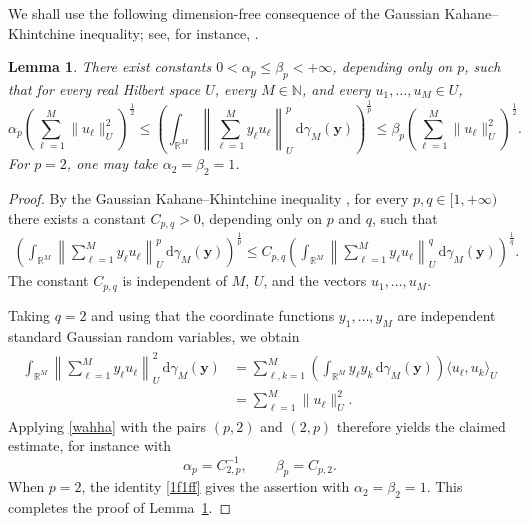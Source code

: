\documentclass[12pt]{article}
\theoremstyle{plain}
\newtheorem{lemma}[theorem]{Lemma}
\theoremstyle{definition}
\theoremstyle{remark}
\numberwithin{equation}{section}
\begin{document}
We shall use the following dimension-free consequence of the Gaussian
Kahane--Khintchine inequality; see, for instance,
\cite[Theorem~6.2.6, p.~23]{HNVW}.

\begin{lemma}
	\label{lem:gaussian-randomization-hilbert}
There exist constants
	$0<\alpha_p\leqslant\beta_p<+\infty$, depending only on $p$, such that
	for every real Hilbert space $U$, every $M\in\mathbb{N}$, and every
	$u_1,\ldots,u_M\in U$,
	\[
	\alpha_p
	\left(\sum_{\ell=1}^{M}\|u_\ell\|_U^2\right)^{\frac12}
	\leqslant
	\left(
	\int_{\mathbb{R}^M}
	\left\|\sum_{\ell=1}^{M}y_\ell u_\ell\right\|_U^p
	\,\mathrm{d}\gamma_M(\mathbf{y})
	\right)^{\frac1p}
	\leqslant
	\beta_p
	\left(\sum_{\ell=1}^{M}\|u_\ell\|_U^2\right)^{\frac12}.
	\]
	For $p=2$, one may take $\alpha_2=\beta_2=1$.
\end{lemma}

\begin{proof}
	By the Gaussian Kahane--Khintchine inequality
\cite[Theorem~6.2.6, p.~23]{HNVW},
	for every $p,q\in[1,+\infty)$ there exists a constant
	$C_{p,q}>0$, depending only on $p$ and $q$, such that
\begin{eqnarray}\label{wahha}
		\left(
	\int_{\mathbb{R}^M}
	\left\|\sum_{\ell=1}^{M}y_\ell u_\ell\right\|_U^p
	\,\mathrm{d}\gamma_M(\mathbf{y})
	\right)^{\frac1p}
	\leqslant
	C_{p,q}
	\left(
	\int_{\mathbb{R}^M}
	\left\|\sum_{\ell=1}^{M}y_\ell u_\ell\right\|_U^q
	\,\mathrm{d}\gamma_M(\mathbf{y})
	\right)^{\frac1q}.
\end{eqnarray}
	The constant $C_{p,q}$ is independent of $M$, $U$, and the vectors
	$u_1,\ldots,u_M$.
	
	Taking $q=2$ and using that the coordinate functions
	$y_1,\ldots,y_M$ are independent standard Gaussian random variables,
	we obtain
\begin{eqnarray}\label{1f1ff}
		\begin{aligned}
		\int_{\mathbb{R}^M}
		\left\|\sum_{\ell=1}^{M}y_\ell u_\ell\right\|_U^2
		\,\mathrm{d}\gamma_M(\mathbf{y})
		&=
		\sum_{\ell,k=1}^{M}
		\left(
		\int_{\mathbb{R}^M}y_\ell y_k
		\,\mathrm{d}\gamma_M(\mathbf{y})
		\right)
		\langle u_\ell,u_k\rangle_U
		\\
		&=
		\sum_{\ell=1}^{M}\|u_\ell\|_U^2.
	\end{aligned}
\end{eqnarray}
	Applying  \eqref{wahha} with the pairs
	$(p,2)$ and $(2,p)$ therefore yields the claimed estimate, for instance
	with
	\[
	\alpha_p=C_{2,p}^{-1},
	\qquad
	\beta_p=C_{p,2}.
	\]
	When $p=2$, the identity \eqref{1f1ff} gives the assertion with
	$\alpha_2=\beta_2=1$.  This completes the proof of Lemma~\ref{lem:gaussian-randomization-hilbert}.
\end{proof}
\end{document}
